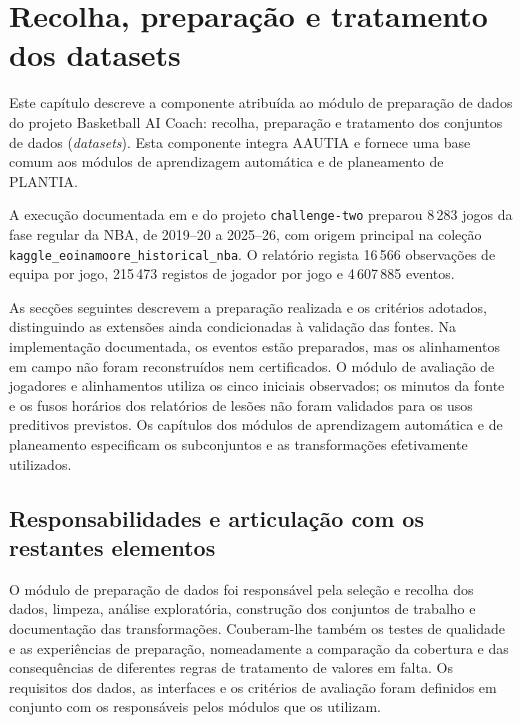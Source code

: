 \chapter{Recolha, preparação e tratamento dos datasets}
\label{chap:data}

Este capítulo descreve a componente atribuída ao módulo de preparação de dados do projeto
Basketball AI Coach: recolha, preparação e tratamento dos conjuntos de
dados (\emph{datasets}). Esta componente integra AAUTIA e fornece uma base
comum aos módulos de aprendizagem automática e de planeamento de PLANTIA.

A execução documentada em  e
 do projeto \texttt{challenge-two}
preparou 8\,283 jogos da fase regular da NBA, de 2019--20 a 2025--26,
com origem principal na coleção \texttt{kaggle\_eoinamoore\_historical\_nba}.
O relatório regista 16\,566 observações de equipa por jogo, 215\,473
registos de jogador por jogo e 4\,607\,885 eventos.

As secções seguintes descrevem a preparação realizada e os critérios
adotados, distinguindo as extensões ainda condicionadas à validação das fontes.
Na implementação documentada, os eventos estão preparados, mas os
alinhamentos em campo não foram reconstruídos nem certificados. O
módulo de avaliação de jogadores e alinhamentos utiliza os cinco iniciais observados; os minutos da fonte e os
fusos horários dos relatórios de lesões não foram validados para os usos
preditivos previstos. Os capítulos dos módulos de aprendizagem automática e de planeamento especificam os
subconjuntos e as transformações efetivamente utilizados.

\section{Responsabilidades e articulação com os restantes elementos}

O módulo de preparação de dados foi responsável pela seleção e recolha dos dados, limpeza,
análise exploratória, construção dos conjuntos de trabalho e documentação
das transformações. Couberam-lhe também os testes de qualidade e as
experiências de preparação, nomeadamente a comparação da cobertura e das
consequências de diferentes regras de tratamento de valores em falta.
Os requisitos dos dados, as interfaces e os critérios de avaliação foram
definidos em conjunto com os responsáveis pelos módulos que os utilizam.

